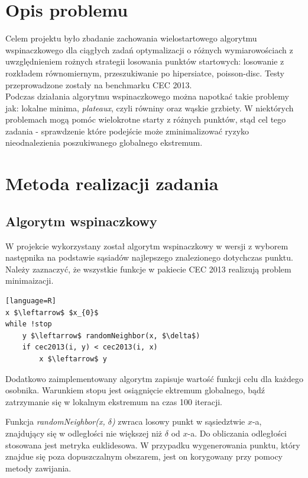 \documentclass{article}
\begin{document}
\section{Opis problemu}

Celem projektu było zbadanie zachowania wielostartowego algorytmu wspinaczkowego dla ciągłych zadań optymalizacji o różnych wymiarowościach z uwzględnieniem rożnych strategii losowania punktów startowych: losowanie z rozkładem równomiernym, przeszukiwanie po hipersiatce, poisson-disc. Testy przeprowadzone zostały na benchmarku CEC 2013.\\

Podczas działania algorytmu wspinaczkowego można napotkać takie problemy jak: lokalne minima, \textit{plateaux}, czyli równiny oraz wąskie grzbiety. W niektórych problemach mogą pomóc wielokrotne starty z różnych punktów, stąd cel tego zadania - sprawdzenie które podejście może zminimalizować ryzyko nieodnalezienia poszukiwanego globalnego ekstremum.

\section{Metoda realizacji zadania}

\subsection{Algorytm wspinaczkowy}

W projekcie wykorzystany został algorytm wspinaczkowy w wersji z wyborem następnika na podstawie sąsiadów najlepszego znalezionego dotychczas punktu. \\
Należy zaznaczyć, że wszystkie funkcje w pakiecie CEC 2013 realizują problem minimaizacji.

\begin{lstlisting}[mathescape][language=R]
x $\leftarrow$ $x_{0}$
while !stop
	y $\leftarrow$ randomNeighbor(x, $\delta$)
	if cec2013(i, y) < cec2013(i, x)
		x $\leftarrow$ y
\end{lstlisting}
Dodatkowo zaimplementowany algorytm zapisuje wartość funkcji celu dla każdego osobnika. Warunkiem stopu jest osiągnięcie ektremum globalnego, bądź zatrzymanie się w lokalnym ekstremum na czas 100 iteracji.

Funkcja \textit{randomNeighbor(x, $\delta$)} zwraca losowy punkt w sąsiedztwie $x$-a, znajdujący się w odległości nie większej niż $\delta$ od $x$-a. Do obliczania odległości stosowana jest metryka euklidesowa. W przypadku wygenerowania punktu, który znajdue się poza dopuszczalnym obszarem, jest on korygowany przy pomocy metody zawijania.\\
\end{document}
